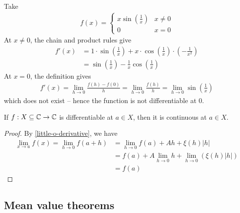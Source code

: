 \documentclass{../template/note}
\begin{document}
    \begin{example*}
        Take
        \begin{align*}
            f(x) = \begin{cases}
                x \sin \left(\frac 1 x\right) & x \neq 0 \\
                0 & x = 0
            \end{cases}
        \end{align*}
        At \(x \neq 0\), the chain and product rules give
        \begin{align*}
            f'(x) &= 1 \cdot \sin\left(\frac 1 x \right) + x \cdot \cos\left(\frac 1 x\right) \cdot \left(-\frac 1 {x^2}\right) \\
            &= \sin \left(\frac 1 x\right) - \frac 1 x \cos\left(\frac 1 x\right)
        \end{align*}
        At \(x = 0\), the definition gives
        \begin{align*}
            f'(x) = \lim_{h \to 0} \frac{f(h)-f(0)}h = \lim_{h \to 0} \frac{f(h)} h = \lim_{h \to 0} \sin \left(\frac 1 x\right)
        \end{align*}
        which does not exist -- hence the function is not differentiable at 0.
    \end{example*}
    
    \begin{lemma}
        \label{diff-cont}
        If \(f: X \subseteq \mathbb C \to \mathbb C\) is differentiable at \(a \in X\), then it is continuous at \(a \in X\).
    \end{lemma}
    
    \begin{proof}
        By \cref{little-o-derivative}, we have
        \begin{align*}
            \lim_{x \to a} f(x) = \lim_{h \to 0} f(a+h) &= \lim_{h \to 0} f(a) + Ah + \xi(h)|h| \\
            &= f(a) + A \lim_{h \to 0} h + \lim_{h \to 0} \left(\xi(h)|h|\right) \\
            &= f(a)
        \end{align*}
    \end{proof}

    
    \subsection{Mean value theorems}
\end{document}
